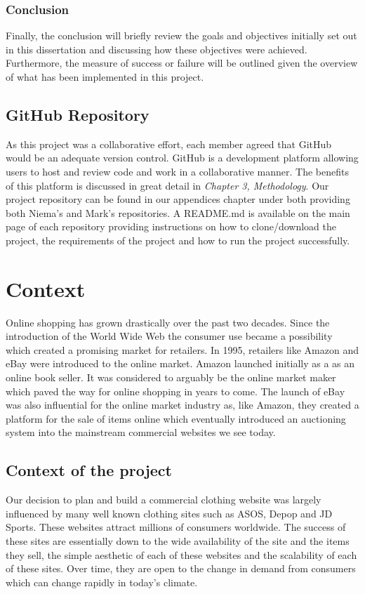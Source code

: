 \subsection{Conclusion}
Finally, the conclusion will briefly review the goals and objectives initially set out in this dissertation and discussing how these objectives were achieved. Furthermore, the measure of success or failure will be outlined given the overview of what has been implemented in this project.

\section{GitHub Repository}
As this project was a collaborative effort, each member agreed that GitHub would be an adequate version control. GitHub is a development platform allowing users to host and review code and work in a collaborative manner. The benefits of this platform is discussed in great detail in \textit{Chapter 3, Methodology}. Our project repository can be found in our appendices chapter under both providing both Niema's and Mark's repositories. A README.md is available on the main page of each repository providing instructions on how to clone/download the project, the requirements of the project and how to run the project successfully.

\chapter{Context}

Online shopping has grown drastically over the past two decades. Since the introduction of the World Wide Web the consumer use became a possibility which created a promising market for retailers. In 1995, retailers like Amazon and eBay were introduced to the online market. Amazon launched initially as a as an online book seller. It was considered to arguably be the online market maker which paved the way for online shopping in years to come\cite{openlearn_2019}. The launch of eBay was also influential for the online market industry as, like Amazon, they created a platform for the sale of items online which eventually introduced an auctioning system into the mainstream commercial websites we see today.

\section{Context of the project}
Our decision to plan and build a commercial clothing website was largely influenced by many well known clothing sites such as ASOS, Depop and JD Sports. These websites attract millions of consumers worldwide. The success of these sites are essentially down to the wide availability of the site and the items they sell, the simple aesthetic of each of these websites and the scalability of each of these sites. Over time, they are open to the change in demand from consumers which can change rapidly in today's climate. 
\newpage

